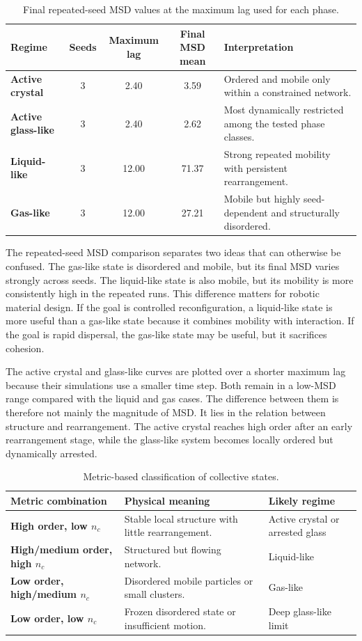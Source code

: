 \documentclass[12pt,a4paper,oneside]{report}
\begin{document}
\begin{table}[H]
\centering
\caption{Final repeated-seed MSD values at the maximum lag used for each phase.}
\label{tab:repeatedseedsummary}
\begin{tabularx}{\textwidth}{>{\bfseries}p{3.2cm}cccX}
\toprule
Regime & Seeds & Maximum lag & Final MSD mean & Interpretation \\
\midrule
Active crystal & 3 & 2.40 & 3.59 & Ordered and mobile only within a constrained network. \\
Active glass-like & 3 & 2.40 & 2.62 & Most dynamically restricted among the tested phase classes. \\
Liquid-like & 3 & 12.00 & 71.37 & Strong repeated mobility with persistent rearrangement. \\
Gas-like & 3 & 12.00 & 27.21 & Mobile but highly seed-dependent and structurally disordered. \\
\bottomrule
\end{tabularx}
\end{table}

The repeated-seed MSD comparison separates two ideas that can otherwise be confused. The gas-like state is disordered and mobile, but its final MSD varies strongly across seeds. The liquid-like state is also mobile, but its mobility is more consistently high in the repeated runs. This difference matters for robotic material design. If the goal is controlled reconfiguration, a liquid-like state is more useful than a gas-like state because it combines mobility with interaction. If the goal is rapid dispersal, the gas-like state may be useful, but it sacrifices cohesion.

The active crystal and glass-like curves are plotted over a shorter maximum lag because their simulations use a smaller time step. Both remain in a low-MSD range compared with the liquid and gas cases. The difference between them is therefore not mainly the magnitude of MSD. It lies in the relation between structure and rearrangement. The active crystal reaches high order after an early rearrangement stage, while the glass-like system becomes locally ordered but dynamically arrested.

\begin{table}[H]
\centering
\caption{Metric-based classification of collective states.}
\label{tab:metrics}
\begin{tabularx}{\textwidth}{>{\bfseries}p{3.2cm}X X}
\toprule
Metric combination & Physical meaning & Likely regime \\
\midrule
High order, low $n_c$ & Stable local structure with little rearrangement. & Active crystal or arrested glass \\
High/medium order, high $n_c$ & Structured but flowing network. & Liquid-like \\
Low order, high/medium $n_c$ & Disordered mobile particles or small clusters. & Gas-like \\
Low order, low $n_c$ & Frozen disordered state or insufficient motion. & Deep glass-like limit \\
\bottomrule
\end{tabularx}
\end{table}
\end{document}
